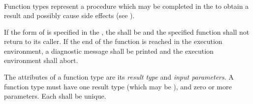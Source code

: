 \begin{grammar}
 \\
	   \\

 \\
	\terminal{(}  \terminal{)}  \\

 \\
	 \\

 \\
	 \optional{\terminal{,}} \\
	  \optional{\terminal{,}} \\
	 \terminal{,}  \optional{\terminal{,}} \\

 \\
	 \\
	 \terminal{,}  \\

 \\
	 \terminal{:}  \\
	\terminal{\_} \terminal{:}  \\
\end{grammar}

\specsubsubitem
Function types represent a procedure which may be completed in the
 to obtain a result and possibly cause side
effects (see ).

\specsubsubitem
If the  form of  is specified in
the , the  shall be
 and the specified function shall not return to its caller. If
the end of the function is reached in the execution environment, a diagnostic
message shall be printed and the execution environment shall abort.

\specsubsubitem
The attributes of a function type are its \textit{result type} and
\textit{input parameters}. A function type must have one result type (which may
be ), and zero or more parameters. Each  shall
be unique.

